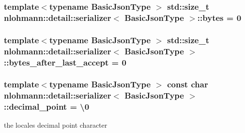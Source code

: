 \subsubsection[{\texorpdfstring{bytes}{bytes}}]{\setlength{\rightskip}{0pt plus 5cm}template$<$typename Basic\+Json\+Type $>$ std\+::size\+\_\+t {\bf nlohmann\+::detail\+::serializer}$<$ Basic\+Json\+Type $>$\+::bytes = 0}\hypertarget{classnlohmann_1_1detail_1_1serializer_a4239a42672c7378a6b449ee010e6dace}{}\label{classnlohmann_1_1detail_1_1serializer_a4239a42672c7378a6b449ee010e6dace}
\subsubsection[{\texorpdfstring{bytes\+\_\+after\+\_\+last\+\_\+accept}{bytes_after_last_accept}}]{\setlength{\rightskip}{0pt plus 5cm}template$<$typename Basic\+Json\+Type $>$ std\+::size\+\_\+t {\bf nlohmann\+::detail\+::serializer}$<$ Basic\+Json\+Type $>$\+::bytes\+\_\+after\+\_\+last\+\_\+accept = 0}\hypertarget{classnlohmann_1_1detail_1_1serializer_a9ae3daaea1941fd02d4c3c1b0f5fbe68}{}\label{classnlohmann_1_1detail_1_1serializer_a9ae3daaea1941fd02d4c3c1b0f5fbe68}
\subsubsection[{\texorpdfstring{decimal\+\_\+point}{decimal_point}}]{\setlength{\rightskip}{0pt plus 5cm}template$<$typename Basic\+Json\+Type $>$ const char {\bf nlohmann\+::detail\+::serializer}$<$ Basic\+Json\+Type $>$\+::decimal\+\_\+point = \textquotesingle{}\textbackslash{}0\textquotesingle{}}\hypertarget{classnlohmann_1_1detail_1_1serializer_a311e5d6f4b31d5be0eb3c0cb20b6965a}{}\label{classnlohmann_1_1detail_1_1serializer_a311e5d6f4b31d5be0eb3c0cb20b6965a}


the locale\textquotesingle{}s decimal point character 

